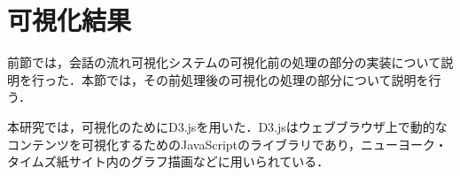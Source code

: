 \documentclass[shuuron]{kuee}
\begin{document}













\section{可視化結果}

前節では，会話の流れ可視化システムの可視化前の処理の部分の実装について説明を行った．本節では，その前処理後の可視化の処理の部分について説明を行う．





本研究では，可視化のためにD3.js\cite{vand3}を用いた．D3.jsはウェブブラウザ上で動的なコンテンツを可視化するためのJavaScriptのライブラリであり，ニューヨーク・タイムズ紙サイト内のグラフ描画などに用いられている．
\end{document}
